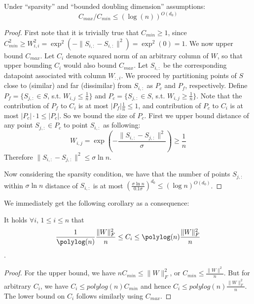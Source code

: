 \documentclass{sig-alternate}
\begin{document}
\begin{lemma}
Under ``sparsity'' and ``bounded doubling dimension'' assumptions:
\[
C_{max}/C_{min} \leq (\log(n))^{O(d_0)}
\]
\end{lemma}
\begin{proof}
First note that it is trivially true that $C_{min} \geq 1$, since $C_{min}^2 \geq W_{i,i}^2 =  \exp^2(-\|S_{i,:} - S_{i,:} \|^2) = \exp^2(0) = 1$. We now upper bound $C_{max}$. Let $C_i$ denote squared norm of an arbitrary column of $W$, so that upper bounding $C_i$ would also bound $C_{max}$. Let $S_{i,:}$ be the corresponding datapoint associated with column $W_{:,i}$.
We proceed by partitioning points of $S$ close to (similar) and far (dissimilar) from $S_{i,:}$ as $P_c$ and $P_f$, respectively.
Define $P_f = \{ S_{j,:} \in S$, s.t. $W_{i,j} \leq \frac{1}{n} \}$ and $P_c = \{ S_{j,:} \in S$, s.t. $W_{i,j} \geq \frac{1}{n} \}$. Note that the contribution of $P_f$ to $C_i$ is at most $| P_f | \frac{1}{n} \leq 1$, and contribution of $P_c$ to $C_i$ is at most 
 $| P_c| \cdot 1 \leq |P_c|$. So we bound the size of $P_c$. First we upper bound distance of any point $S_{j,:} \in P_c$ to point $S_{i,:}$ as following:
\[
W_{i,j} = \exp \left(-\frac{\|S_{i,:} - S_{j,:} \|^2}{\sigma} \right) \geq \frac{1}{n}
\]
Therefore $\|S_{i,:} - S_{j,:} \|^2  \leq \sigma \ln n$.

Now considering the sparsity condition, we have that the number of points $S_{j,:}$ within $\sigma \ln n$ distance of $S_{i,:}$ is at most 
$\left(\frac{\sigma \ln n} {0.1 \sigma} \right)^{d_0} \leq (\log n)^{O(d_0)}$.
\end{proof}
We immediately get the following corollary as a consequence:
\begin{corollary}\label{cor:first}
It holds $\forall i$, $1 \leq i \leq n$ that $$\frac{1}{\polylog(n)} \frac{ \| W \|_F^2 }{n} \leq C_i \leq \polylog(n) \frac{ \| W \|_F^2 }{n}$$.
\end{corollary}
\begin{proof}
For the upper bound, we have $n C_{min} \leq \| W \|_F^2$, or $C_{min} \leq \frac{\| W \|^2}{n}$. But for  arbitrary $C_i$, we have $C_i \leq polylog(n) C_{min}$ and hence $C_i \leq polylog(n) \frac{ \| W \|_F^2 }{n}$. The lower bound on $C_i$ follows similarly using $C_{max}$.
\end{proof}
\end{document}
